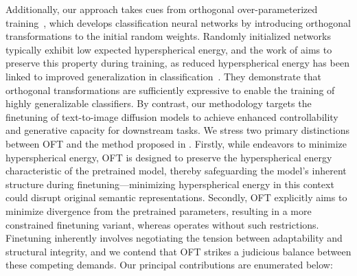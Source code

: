 Additionally, our approach takes cues from orthogonal over-parameterized training~\cite{liu2021orthogonal}, which develops classification neural networks by introducing orthogonal transformations to the initial random weights. Randomly initialized networks typically exhibit low expected hyperspherical energy, and the work of \cite{liu2021orthogonal} aims to preserve this property during training, as reduced hyperspherical energy has been linked to improved generalization in classification~\cite{liu2018learning,lin2020regularizing}. They demonstrate that orthogonal transformations are sufficiently expressive to enable the training of highly generalizable classifiers. By contrast, our methodology targets the finetuning of text-to-image diffusion models to achieve enhanced controllability and generative capacity for downstream tasks. We stress two primary distinctions between OFT and the method proposed in \cite{liu2021orthogonal}. Firstly, while \cite{liu2021orthogonal} endeavors to minimize hyperspherical energy, OFT is designed to preserve the hyperspherical energy characteristic of the pretrained model, thereby safeguarding the model’s inherent structure during finetuning—minimizing hyperspherical energy in this context could disrupt original semantic representations. Secondly, OFT explicitly aims to minimize divergence from the pretrained parameters, resulting in a more constrained finetuning variant, whereas \cite{liu2021orthogonal} operates without such restrictions. Finetuning inherently involves negotiating the tension between adaptability and structural integrity, and we contend that OFT strikes a judicious balance between these competing demands. Our principal contributions are enumerated below:

